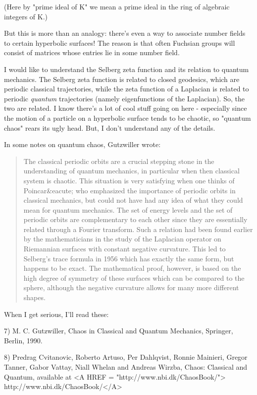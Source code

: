 (Here by "prime ideal of K" we mean a prime ideal in the 
ring of algebraic integers of K.)

But this is more than an analogy: there's even a way to associate number
fields to certain hyperbolic surfaces!  The reason is that often
Fuchsian groups will consist of matrices whose entries lie in some
number field. 

I would like to understand the Selberg zeta function and its relation
to quantum mechanics.  The Selberg zeta function is related to closed 
geodesics, which are periodic classical trajectories, while the zeta 
function of a Laplacian is related to periodic \emph{quantum} trajectories 
(namely eigenfunctions of the Laplacian).  So, the two are related.  
I know there's a lot of cool stuff going on here - especially since 
the motion of a particle on a hyperbolic surface tends to be chaotic,
so "quantum chaos" rears its ugly head.  But, I don't understand any of the 
details.

In some notes on quantum chaos, Gutzwiller wrote:

\begin{quote}
  The classical periodic orbits are a crucial stepping stone in the 
  understanding of quantum mechanics, in particular when then classical 
  system is chaotic.  This situation is very satisfying when one 
  thinks of Poincar&eacute; who emphasized the importance of periodic orbits 
  in classical mechanics, but could not have had any idea of what 
  they could mean for quantum mechanics.  The set of energy levels and
  the set of periodic orbits are complementary to each other since 
  they are essentially related through a Fourier transform.  Such a 
  relation had been found earlier by the mathematicians in the study 
  of the Laplacian operator on Riemannian surfaces with constant 
  negative curvature.  This led to Selberg's trace formula in 1956 
  which has exactly the same form, but happens to be exact.  The 
  mathematical proof, however, is based on the high degree of symmetry
  of these surfaces which can be compared to the sphere, although the 
  negative curvature allows for many more different shapes.

\end{quote}
When I get serious, I'll read these:

7) M. C. Gutzwiller, Chaos in Classical and Quantum Mechanics,
Springer, Berlin, 1990.

8) Predrag Cvitanovic, Roberto Artuso, Per Dahlqvist, Ronnie Mainieri, 
Gregor Tanner, Gabor Vattay, Niall Whelan and Andreas Wirzba, Chaos: 
Classical and Quantum, available at <A HREF = "http://www.nbi.dk/ChaosBook/">
http://www.nbi.dk/ChaosBook/</A>

